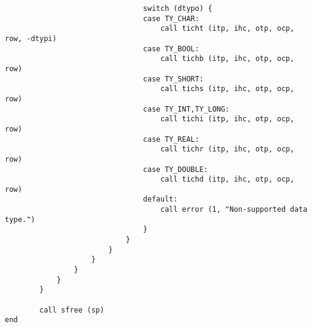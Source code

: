 \begin{verbatim}
                                switch (dtypo) {
                                case TY_CHAR:
                                    call ticht (itp, ihc, otp, ocp, row, -dtypi)
                                case TY_BOOL:
                                    call tichb (itp, ihc, otp, ocp, row)
                                case TY_SHORT:
                                    call tichs (itp, ihc, otp, ocp, row)
                                case TY_INT,TY_LONG:
                                    call tichi (itp, ihc, otp, ocp, row)
                                case TY_REAL:
                                    call tichr (itp, ihc, otp, ocp, row)
                                case TY_DOUBLE:
                                    call tichd (itp, ihc, otp, ocp, row)
                                default:
                                    call error (1, "Non-supported data type.")
                                }
                            }
                        }
                    }
                }
            }
        }

        call sfree (sp)
end


\end{verbatim}
\newpage
{}

